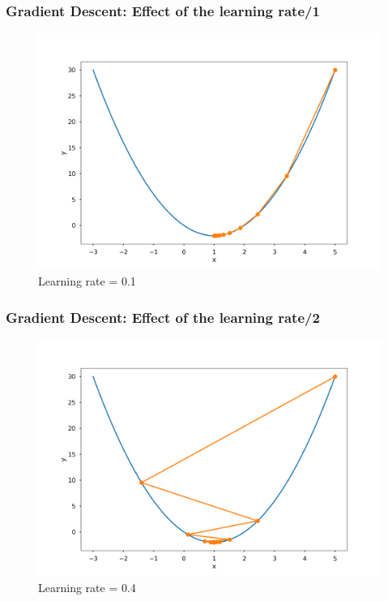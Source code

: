 \documentclass{beamer}
\begin{document}
	\begin{frame}
		\frametitle{Gradient Descent: Effect of the learning rate/1}
		\begin{figure}
			\centering
			\includegraphics[scale=0.3]{images/gradient_descent_1}
			\caption{Learning rate = 0.1}
		\end{figure}
	\end{frame}

	\begin{frame}
		\frametitle{Gradient Descent: Effect of the learning rate/2}
		\begin{figure}
			\centering
			\includegraphics[scale=0.3]{images/gradient_descent_2}
			\caption{Learning rate = 0.4}
		\end{figure}
	\end{frame}
\end{document}
